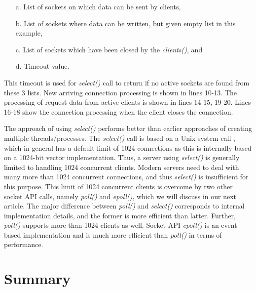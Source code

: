 \begin{multicols}{2}
\vspace{-.5cm}

\begin{itemize}

\setlength{\parskip}{0pt}
  \setlength{\itemsep}{0pt plus 6pt}

\item[\rm a.] List of sockets on which data can be sent by clients,

\item[\rm b.] List of sockets where data can be written, but given empty list in this example,

\item[\rm c.] List of sockets which have been closed by the \textit{clients()}, and

\item[\rm d.] Timeout value.

\end{itemize}

This timeout is used for \textit{select()} call to return if no active sockets are found from these 3 lists. New arriving connection processing is shown in lines 10-13. The processing of request data from active clients is shown in lines 14-15, 19-20. Lines 16-18 show the connection processing when the client closes the connection.

The approach of using \textit{select()} performs better than earlier approaches of creating multiple threads/processes. The \textit{select()} call is based on a Unix system call \cite{art1-key19}\cite{art1-key20}, which in general has a default limit of 1024 connections as this is internally based on a 1024-bit vector implementation. Thus, a server using \textit{select()} is generally limited to handling 1024 concurrent clients. Modern servers need to deal with many more than 1024 concurrent connections, and thus \textit{select()} is insufficient for this purpose. This limit of 1024 concurrent clients is overcome by two other socket API calls, namely \textit{poll()} and \textit{epoll()}, which we will discuss in our next article. The major difference between \textit{poll()} and \textit{select()} corresponds to internal implementation details, and the former is more efficient than latter. Further, \textit{poll()} supports more than 1024 clients as well. Socket API \textit{epoll()} is an event based implementation and is much more efficient than \textit{poll()} in terms of performance.

\section{Summary}


\end{multicols}
